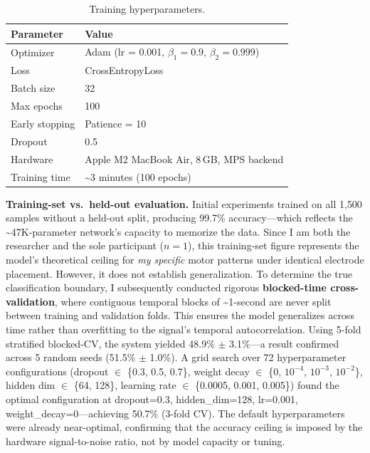\documentclass[11pt, a4paper]{article}
\begin{document}
\begin{table}[h]
\centering
\caption{Training hyperparameters.}
\label{tab:training}
\begin{tabular}{@{}ll@{}}
\toprule
Parameter & Value \\
\midrule
Optimizer & Adam (lr = 0.001, $\beta_1 = 0.9$, $\beta_2 = 0.999$) \\
Loss & CrossEntropyLoss \\
Batch size & 32 \\
Max epochs & 100 \\
Early stopping & Patience = 10 \\
Dropout & 0.5 \\
Hardware & Apple M2 MacBook Air, 8\,GB, MPS backend \\
Training time & \textasciitilde3 minutes (100 epochs) \\
\bottomrule
\end{tabular}
\end{table}

\textbf{Training-set vs.\ held-out evaluation.} Initial experiments trained on all 1{,}500 samples without a held-out split, producing 99.7\% accuracy---which reflects the \textasciitilde47K-parameter network's capacity to memorize the data. Since I am both the researcher and the sole participant ($n=1$), this training-set figure represents the model's theoretical ceiling for \emph{my specific} motor patterns under identical electrode placement. However, it does not establish generalization. To determine the true classification boundary, I subsequently conducted rigorous \textbf{blocked-time cross-validation}, where contiguous temporal blocks of \textasciitilde1-second are never split between training and validation folds. This ensures the model generalizes across time rather than overfitting to the signal's temporal autocorrelation. Using 5-fold stratified blocked-CV, the system yielded 48.9\% $\pm$ 3.1\%---a result confirmed across 5 random seeds (51.5\% $\pm$ 1.0\%). A grid search over 72 hyperparameter configurations (dropout $\in$ \{0.3, 0.5, 0.7\}, weight decay $\in$ \{0, $10^{-4}$, $10^{-3}$, $10^{-2}$\}, hidden dim $\in$ \{64, 128\}, learning rate $\in$ \{0.0005, 0.001, 0.005\}) found the optimal configuration at dropout=0.3, hidden\_dim=128, lr=0.001, weight\_decay=0---achieving 50.7\% (3-fold CV). The default hyperparameters were already near-optimal, confirming that the accuracy ceiling is imposed by the hardware signal-to-noise ratio, not by model capacity or tuning.

\end{document}
